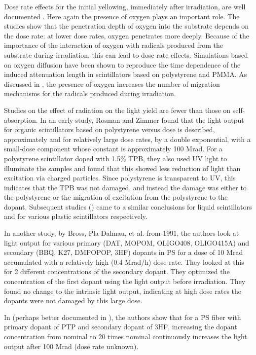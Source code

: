\documentclass[review]{elsarticle}
\begin{document}
Dose rate effects for the initial yellowing, immediately after irradiation, are well documented  \cite{sauli,34504,Wick1991472,289295,173180,173178,Giokaris1993315}.
Here again the presence of oxygen plays an important role.  The studies show that the penetration depth of oxygen into the substrate
depends on the dose rate: at lower dose rates, oxygen penetrates
more deeply.  Because of the importance of the interaction
of oxygen with radicals produced from the substrate during irradiation, this can lead to dose rate effects.
Simulations based on oxygen diffusion have been shown
to reproduce the time dependence of the induced attenuation length in scintillators based on polystyrene and PMMA\cite{Wick1991472}.  
As discussed 
in \cite{Wulkop1995141}, the presence of oxygen
increases the number of migration mechanisms for the radicals produced during irradiation.  


Studies on the effect of radiation on the light yield are fewer
than those on self-absorption.  
In an early study, Rosman and Zimmer\cite{rosmanzimmer} found that the light
output for organic scintillators based on polystyrene versus dose is described,
approximately and for relatively large dose rates, by a double exponential, 
with a small-dose component whose constant is approximately 100 Mrad.
For a polystyrene scintillator doped with 1.5\% TPB, they also used UV light to illuminate
the samples  and found that this showed less
reduction of light than excitation via charged particles.
Since polystyrene is transparent to UV, this
indicates that the TPB was not damaged, and instead the damage
was either to the polystyrene or the migration of excitation from the polystyrene
to the dopant.  Subsequent studies (\cite{berlman,173178}) came to a similar conclusions for
liquid scintillators and for various plastic scintillators respectively. 


In another study, by Bross, Pla-Dalmau, et al. from 1991\cite{Bross199135}, the authors look at light output for various 
primary (DAT, MOPOM, OLIGO408, OLIGO415A) and 
secondary (BBQ, K27, DMPOPOP, 3HF) dopants 
in PS
for a dose of 10 Mrad accumulated with a relatively high (0.4 Mrad/h) dose rate.  They looked at this for 2 different concentrations of the secondary dopant.  They optimized the concentration of the first dopant using the light output before irradiation.  They found no change to the intrinsic light output, indicating at high dose rates the dopants were
not damaged by this large dose.  

In \cite{zorn3} (perhaps better documented in \cite{sauli}), the authors show that for a PS fiber with primary dopant of PTP and secondary dopant of 3HF,
increasing the dopant concentration from nominal to 20 times nominal continuously increases the light output after 100 Mrad (dose rate unknown).
\end{document}

